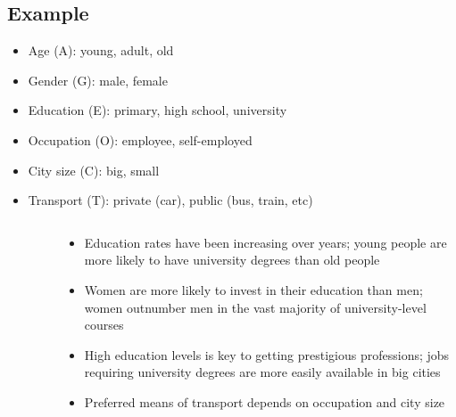 \subsection{Example}
	\begin{frame}
		\begin{itemize}
			\item Age (A): young, adult, old
			\item Gender (G): male, female
			\item Education (E): primary, high school, university
			\item Occupation (O): employee, self-employed
			\item City size (C): big, small
			\item Transport (T): private (car), public (bus, train, etc)
		\end{itemize}
	\end{frame}
	\begin{frame}
		\begin{columns}
			\begin{column}{.3\textwidth}
				\begin{figure}
					\centering
					
				\end{figure}
			\end{column}
			\begin{column}{.7\textwidth}
				\begin{itemize}
					\item Education rates have been increasing over years; young people are more likely to have university degrees than old people
					\item Women are more likely to invest in their education than men; women outnumber men in the vast majority of university-level courses
					\item High education levels is key to getting prestigious professions; jobs requiring university degrees are more easily available in big cities
					\item Preferred means of transport depends on occupation and city size
				\end{itemize}
			\end{column}
		\end{columns}
	\end{frame}
